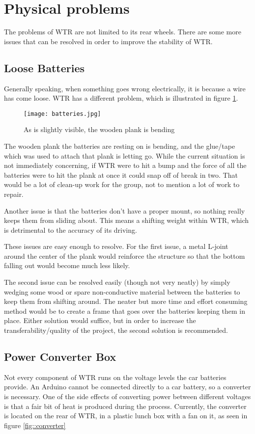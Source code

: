 \section{Physical problems}
The problems of WTR are not limited to its rear wheels.
There are some more issues that can be resolved in order to improve the stability of WTR.

\subsection{Loose Batteries}
Generally speaking, when something goes wrong electrically, it is because a wire has come loose.
WTR has a different problem, which is illustrated in figure \ref{fig::batteries}.

\begin{figure}[H]
\centering
\texttt{[image: batteries.jpg]}
\caption{As is slightly visible, the wooden plank is bending}
\label{fig::batteries}
\end{figure}

The wooden plank the batteries are resting on is bending, and the glue/tape which was used to attach that plank is letting go.
While the current situation is not immediately concerning, if WTR were to hit a bump and the force of all the batteries were to hit the plank at once it could snap off of break in two.
That would be a lot of clean-up work for the group, not to mention a lot of work to repair.

Another issue is that the batteries don't have a proper mount, so nothing really keeps them from sliding about.
This means a shifting weight within WTR, which is detrimental to the accuracy of its driving.

These issues are easy enough to resolve.
For the first issue, a metal L-joint around the center of the plank would reinforce the structure so that the bottom falling out would become much less likely.

The second issue can be resolved easily (though not very neatly) by simply wedging some wood or spare non-conductive material between the batteries to keep them from shifting around.
The neater but more time and effort consuming method would be to create a frame that goes over the batteries keeping them in place.
Either solution would suffice, but in order to increase the transferability/quality of the project, the second solution is recommended.

\subsection{Power Converter Box}
Not every component of WTR runs on the voltage levels the car batteries provide.
An Arduino cannot be connected directly to a car battery, so a converter is necessary.
One of the side effects of converting power between different voltages is that a fair bit of heat is produced during the process.
Currently, the converter is located on the rear of WTR, in a plastic lunch box with a fan on it, as seen in figure \ref{fig::converter}

